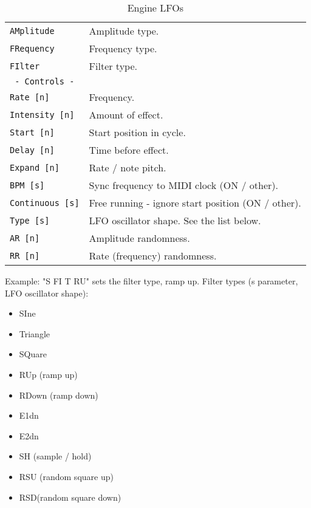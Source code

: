    \begin{table}[H]
      \centering
      \caption{Engine LFOs}
      \label{table:yoshimi_engine_lfos}
      \begin{tabular}{l l}

\texttt{AMplitude} &
   Amplitude type. \\
\texttt{FRequency} &
   Frequency type. \\
\texttt{FIlter} &
   Filter type. \\
\texttt{ - Controls - } & \\
\texttt{Rate [n]} &
   Frequency. \\
\texttt{Intensity [n]} &
   Amount of effect. \\
\texttt{Start [n]} &
   Start position in cycle. \\
\texttt{Delay [n]} &
   Time before effect. \\
\texttt{Expand [n]} &
   Rate / note pitch. \\
\texttt{BPM [s]} &
   Sync frequency to MIDI clock (ON / other). \\
\texttt{Continuous [s]} &
   Free running - ignore start position (ON / other). \\
\texttt{Type [s]} &
   LFO oscillator shape. See the list below. \\
\texttt{AR [n]} &
   Amplitude randomness. \\
\texttt{RR [n]} &
   Rate (frequency) randomness. \\

      \end{tabular}
   \end{table}

Example: "S FI T RU" sets the filter type, ramp up.
Filter types (s parameter, LFO oscillator shape):

   \begin{itemize}
      \item SIne
      \item Triangle
      \item SQuare
      \item RUp (ramp up)
      \item RDown (ramp down)
      \item E1dn
      \item E2dn
      \item SH (sample / hold)
      \item RSU (random square up)
      \item RSD(random square down)
   \end{itemize}

